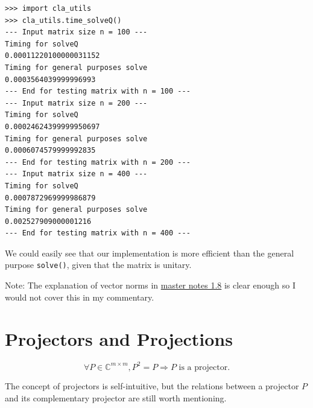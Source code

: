 \bigskip
\begin{lstlisting}
>>> import cla_utils
>>> cla_utils.time_solveQ()
--- Input matrix size n = 100 ---
Timing for solveQ
0.00011220100000031152
Timing for general purposes solve
0.0003564039999996993
--- End for testing matrix with n = 100 ---
--- Input matrix size n = 200 ---
Timing for solveQ
0.00024624399999950697
Timing for general purposes solve
0.0006074579999992835
--- End for testing matrix with n = 200 ---
--- Input matrix size n = 400 ---
Timing for solveQ
0.0007872969999986879
Timing for general purposes solve
0.002527909000001216
--- End for testing matrix with n = 400 ---
\end{lstlisting}
We could easily see that our implementation is more efficient than the general purpose \texttt{solve()}, given that the matrix is unitary.

\medskip
\noindent Note: The explanation of vector norms in \href{https://comp-lin-alg.github.io/L1_preliminaries.html#vector-norms}{master notes 1.8} is clear enough so I would not cover this in my commentary.

\section{Projectors and Projections}%
\begin{definition}[Projector]
  \[
    \forall P \in \mathbb{C}^{m \times m}, P^2 = P \Rightarrow P \text{ is a projector}
  .\]
\end{definition}
The concept of projectors is self-intuitive, but the relations between a projector $P$ and its complementary projector are still worth mentioning.

